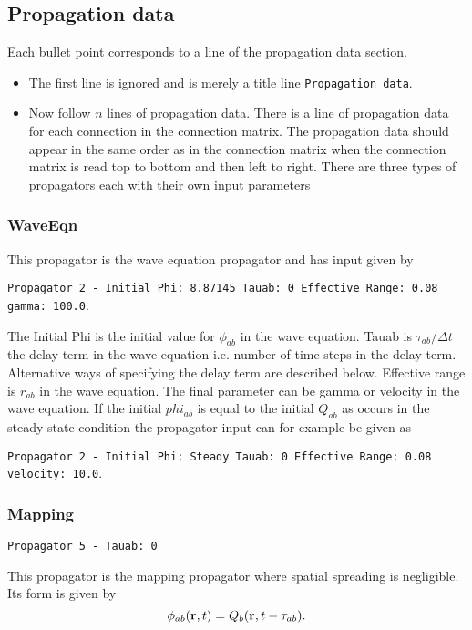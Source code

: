 \documentclass[12pt,a4paper]{article}
\begin{document}
\subsection{Propagation data}
Each bullet point corresponds to a line of the propagation data section.
\begin{itemize}
\item The first line is ignored and is merely a title line {\tt \small Propagation data}.
\item Now follow $n$ lines of propagation data. There is a line of propagation
data for each connection in the connection matrix. The propagation data
should appear in the same order as in the connection matrix when the 
connection matrix is read top to bottom and then left to right. There are three types
of propagators each with their own input parameters
\end{itemize}

\subsubsection{WaveEqn}
This propagator is the wave equation propagator and has input given by

{\tt \small Propagator 2 - Initial Phi: 8.87145 Tauab: 0 Effective Range: 0.08
gamma: 100.0}.

The Initial Phi is the initial value for $\phi_{ab}$ in the
wave equation. Tauab is $\tau_{ab}/ \Delta t$ the delay term in the wave equation
i.e. number of time steps in the delay term. Alternative ways of specifying
the delay term are described below.
Effective range is $r_{ab}$
in the wave equation. The final parameter can be gamma or velocity in the wave equation.
If the initial $phi_{ab}$ is equal to the initial $Q_{ab}$ as occurs in the steady state condition
the propagator input can for example be given as

{\tt \small Propagator 2 - Initial Phi: Steady Tauab: 0 Effective Range: 0.08
velocity: 10.0}.


\subsubsection{Mapping}
{\tt \small Propagator 5  - Tauab: 0 }

This propagator is the mapping propagator where spatial spreading is negligible.
Its form is given by
\begin{equation}
\phi_{ab}({\bf r}, t) = Q_b ({\bf r}, t - \tau_{ab}).
\end{equation}
\end{document}
